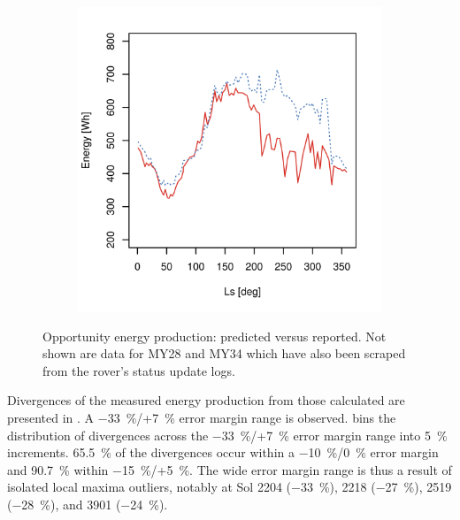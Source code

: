 \begin{figure}[h]
\begin{subfigure}[t]{\subfigureWidth}
  		\label{fig:plot:sub:mer-energy-production-predicted-vs-reported-my32}
  	\end{subfigure}\hfill
	   \begin{subfigure}[t]{\subfigureWidth}
      \centering
  		\includegraphics[height=\graphicsHeight]{sections/mars-solar-energy/photovoltaic-energy/plots/predicted-vs-measured-energy-my33.png}
  		\label{fig:plot:sub:mer-energy-production-predicted-vs-reported-my33}
	   \end{subfigure}\hfill
    \caption[Opportunity energy production: predicted versus reported]
            {Opportunity energy production: predicted versus reported. Not shown are data for \ac{MY}28 and \ac{MY}34 which have also been scraped from the rover's status update logs.}
	\label{fig:plot:mer-energy-production-predicted-vs-reported}
\vspace{-2ex}
\end{figure}

Divergences of the measured energy production from those calculated are presented in . A \SI{-33}{\percent}/+\SI{7}{\percent} error margin range is observed.  bins the distribution of divergences across the \SI{-33}{\percent}/+\SI{7}{\percent} error margin range into \SI{5}{\percent} increments. \SI{65.5}{\percent} of the divergences occur within a \SI{-10}{\percent}/\SI{0}{\percent} error margin and \SI{90.7}{\percent} within \SI{-15}{\percent}/+\SI{5}{\percent}. The wide error margin range is thus a result of isolated local maxima outliers, notably at Sol 2204 (\SI{-33}{\percent}), 2218 (\SI{-27}{\percent}), 2519 (\SI{-28}{\percent}), and 3901 (\SI{-24}{\percent}).

